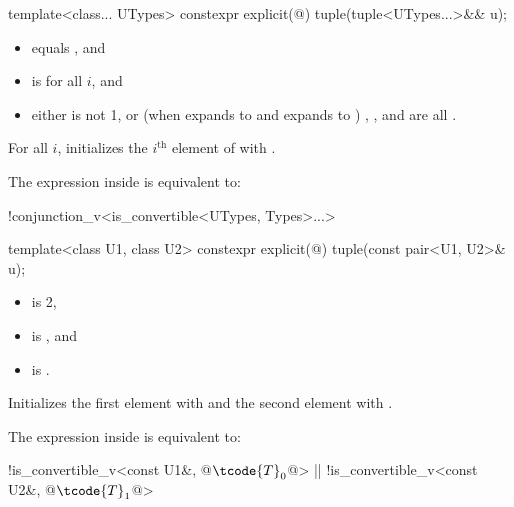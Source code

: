 %
\begin{itemdecl}
template<class... UTypes> constexpr explicit(@\seebelow@) tuple(tuple<UTypes...>&& u);
\end{itemdecl}

\begin{itemdescr}
\pnum
\constraints
\begin{itemize}
\item
{} equals , and

\item
{} is  for all $i$, and

\item
either
 is not 1, or
(when  expands to  and  expands to )
, ,
and  are all .
\end{itemize}

\pnum
\effects
For all $i$,
initializes the $i^\text{th}$ element of  with
.

\pnum
\remarks
The expression inside  is equivalent to:
\begin{codeblock}
!conjunction_v<is_convertible<UTypes, Types>...>
\end{codeblock}
\end{itemdescr}

%
%
\begin{itemdecl}
template<class U1, class U2> constexpr explicit(@\seebelow@) tuple(const pair<U1, U2>& u);
\end{itemdecl}

\begin{itemdescr}
\pnum
\constraints
\begin{itemize}
\item {} is 2,
\item {} is , and
\item {} is .
\end{itemize}

\pnum
\effects
Initializes the first element with  and the
second element with .

\pnum
\remarks
The expression inside  is equivalent to:
\begin{codeblock}
!is_convertible_v<const U1&, @$\tcode{T}_0$@> || !is_convertible_v<const U2&, @$\tcode{T}_1$@>
\end{codeblock}
\end{itemdescr}

